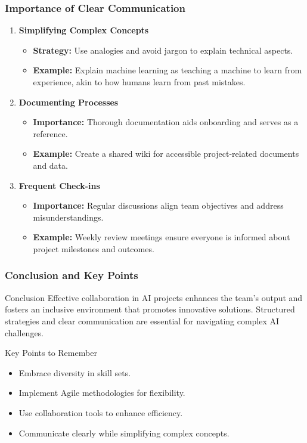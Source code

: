 \documentclass{beamer}
\begin{document}
\begin{frame}[fragile]
    \frametitle{Importance of Clear Communication}
    \begin{enumerate}
        \item \textbf{Simplifying Complex Concepts}
        \begin{itemize}
            \item \textbf{Strategy:} Use analogies and avoid jargon to explain technical aspects.
            \item \textbf{Example:} Explain machine learning as teaching a machine to learn from experience, akin to how humans learn from past mistakes.
        \end{itemize}
        
        \item \textbf{Documenting Processes}
        \begin{itemize}
            \item \textbf{Importance:} Thorough documentation aids onboarding and serves as a reference.
            \item \textbf{Example:} Create a shared wiki for accessible project-related documents and data.
        \end{itemize}
        
        \item \textbf{Frequent Check-ins}
        \begin{itemize}
            \item \textbf{Importance:} Regular discussions align team objectives and address misunderstandings.
            \item \textbf{Example:} Weekly review meetings ensure everyone is informed about project milestones and outcomes.
        \end{itemize}
    \end{enumerate}
\end{frame}

\begin{frame}[fragile]
    \frametitle{Conclusion and Key Points}
    \begin{block}{Conclusion}
        Effective collaboration in AI projects enhances the team's output and fosters an inclusive environment that promotes innovative solutions. Structured strategies and clear communication are essential for navigating complex AI challenges.
    \end{block}
    
    \begin{block}{Key Points to Remember}
        \begin{itemize}
            \item Embrace diversity in skill sets.
            \item Implement Agile methodologies for flexibility.
            \item Use collaboration tools to enhance efficiency.
            \item Communicate clearly while simplifying complex concepts.
        \end{itemize}
    \end{block}
\end{frame}
\end{document}
